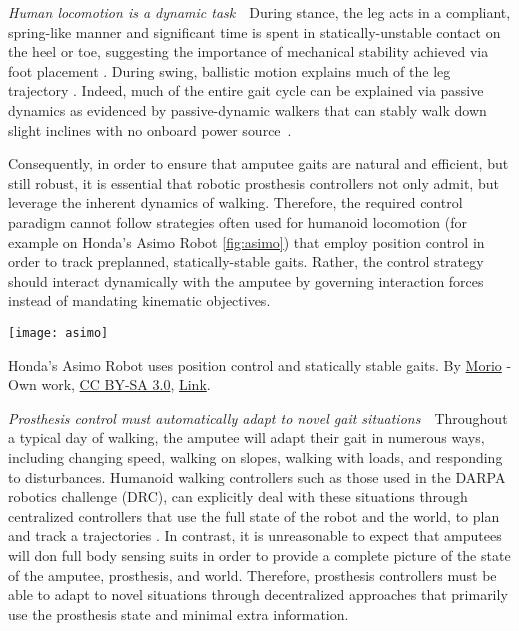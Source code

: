 \begin{challenges}
    \item\label{chal:dynamic} \emph{Human locomotion is a dynamic task}~~During
    stance, the leg acts in a compliant, spring-like manner
    \citep{geyer2006compliant} and significant time is spent in
    statically-unstable contact on the heel or toe, suggesting the importance of
    mechanical stability achieved via foot placement \citep{perry2010gait}.
    During swing, ballistic motion explains much of the leg trajectory
    \citep{mochon1980ballistic}. Indeed, much of the entire gait cycle can be
    explained via passive dynamics as evidenced by passive-dynamic walkers that
    can stably walk down slight inclines with no onboard power
    source~\citep{mcgeer1990passive, collins2005efficient}.

    Consequently, in order to ensure that amputee gaits are natural and
    efficient, but still robust, it is essential that robotic prosthesis
    controllers not only admit, but leverage the inherent dynamics of walking.
    Therefore, the required control paradigm cannot follow strategies often used
    for humanoid locomotion (for example on Honda's Asimo Robot
    \cref{fig:asimo}) that employ position control in order to track preplanned,
    statically-stable gaits. Rather, the control strategy should interact
    dynamically with the amputee by governing interaction forces instead of
    mandating kinematic objectives.

    \begin{marginfigure}
        \centering
        \texttt{[image: asimo]}
        \caption{Honda's Asimo Robot uses position control and statically stable
        gaits. By \href{http://commons.wikimedia.org/wiki/User:Morio}{Morio} -
        Own work, \href{http://creativecommons.org/licenses/by-sa/3.0}{CC BY-SA
        3.0},
        \href{https://commons.wikimedia.org/w/index.php?curid=29969316}{Link}.}
        \label{fig:asimo}
    \end{marginfigure}

    \item\label{chal:adaptability} \emph{Prosthesis control must automatically
    adapt to novel gait situations}~~Throughout a typical day of walking, the
    amputee will adapt their gait in numerous ways, including changing speed,
    walking on slopes, walking with loads, and responding to disturbances.
    Humanoid walking controllers such as those used in the DARPA robotics
    challenge (DRC), can explicitly deal with these situations through
    centralized controllers that use the full state of the robot and the world,
    to plan and track a trajectories \citep{feng2015optimization,
    kuindersma2014efficiently, englsberger2014trajectory}. In contrast, it is
    unreasonable to expect that amputees will don full body sensing suits in
    order to provide a complete picture of the state of the amputee, prosthesis,
    and world. Therefore, prosthesis controllers must be able to adapt to novel
    situations through decentralized approaches that primarily use the
    prosthesis state and minimal extra information.


\end{challenges}
